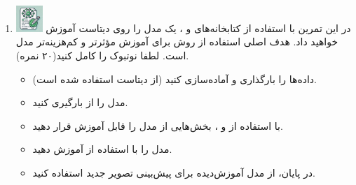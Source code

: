 \documentclass[12pt]{article}
\begin{document}
\begin{enumerate}
     \item \includegraphics[width=1cm]{figs/Allowed_with_contributino.jpg}
     در این تمرین با استفاده از کتابخانه‌های   و ، یک مدل  را روی دیتاست  آموزش خواهید داد. هدف اصلی استفاده از روش  برای آموزش مؤثرتر و کم‌هزینه‌تر مدل است. لطفا نوتبوک  را کامل کنید(۲۰ نمره).

     \begin{itemize}
         \item داده‌ها را بارگذاری و آماده‌سازی کنید (از دیتاست  استفاده شده است).
         \item     مدل  را از  بارگیری کنید.
        \item     با استفاده از  و ، بخش‌هایی از مدل را قابل آموزش قرار دهید.
        \item     مدل را با استفاده از  آموزش دهید.
        \item     در پایان، از مدل آموزش‌دیده برای پیش‌بینی تصویر جدید استفاده کنید.
    
     \end{itemize}
    


\end{enumerate}
\end{document}
